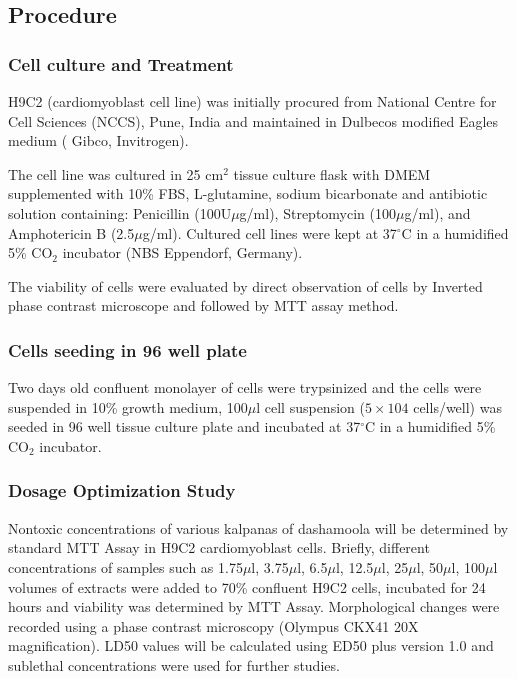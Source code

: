 \documentclass[11pt]{report} %
\begin{document}
\subsection{Procedure}
\label{subsec:Procedure}

\subsubsection{Cell culture and Treatment}
\label{subsubsec:Cell culture and Treatment}

H9C2 (cardiomyoblast cell line) was initially procured from National Centre for Cell Sciences (NCCS), Pune, India and maintained in Dulbecos modified Eagles medium ( Gibco, Invitrogen).

The  cell line was  cultured in 25 cm$^2 $ tissue culture flask with DMEM supplemented with 10\% FBS, L-glutamine, sodium bicarbonate and antibiotic solution containing: Penicillin (100U$\mu$g/ml), Streptomycin (100$\mu$g/ml), and Amphotericin B (2.5$\mu$g/ml). Cultured cell lines were kept at 37$^{\circ}$C in a humidified 5\% CO$_2$ incubator (NBS Eppendorf, Germany). 

The viability of cells were evaluated by direct observation of cells by Inverted phase contrast microscope and followed by MTT assay method.

\subsubsection{Cells seeding in 96 well plate}
\label{subsubsec:Cells seeding in 96 well plate}

Two days old confluent monolayer of cells were trypsinized and the cells were suspended in 10\% growth medium, 100$\mu$l cell suspension ($ 5\times104 $ cells/well) was seeded in 96 well tissue culture plate and incubated at 37$^{\circ}$C in a humidified 5\% CO$_2$ incubator. 

\subsubsection{Dosage Optimization Study}
\label{subsub:Dosage Optimization Study}

Nontoxic concentrations of various kalpanas of dashamoola will be determined by standard
MTT Assay in H9C2 cardiomyoblast cells. Briefly, different concentrations of samples such as
1.75$\mu$l, 3.75$\mu$l, 6.5$\mu$l, 12.5$\mu$l, 25$\mu$l, 50$\mu$l, 100$\mu$l volumes of extracts were added to 70\% confluent H9C2 cells, incubated for 24 hours and viability was determined by MTT Assay. Morphological changes were recorded using a phase contrast microscopy (Olympus CKX41 20X magnification). LD50 values will be calculated using ED50 plus version 1.0 and sublethal concentrations were used for further studies.
\end{document}
